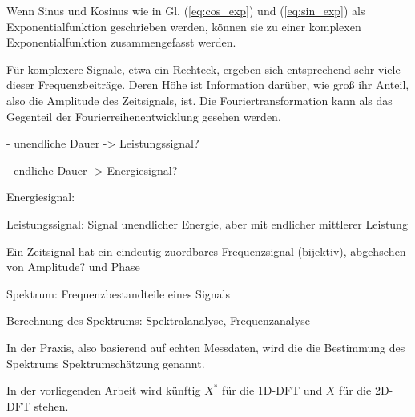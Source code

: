 Wenn Sinus und Kosinus wie in Gl. (\ref{eq:cos_exp}) und (\ref{eq:sin_exp}) als Exponentialfunktion geschrieben werden,
können sie zu einer komplexen Exponentialfunktion zusammengefasst werden.






Für komplexere Signale, etwa ein Rechteck, ergeben sich entsprechend sehr viele dieser Frequenzbeiträge. Deren Höhe ist Information darüber, wie groß ihr Anteil, also die Amplitude des 
Zeitsignals, ist. Die Fouriertransformation kann als das Gegenteil der Fourierreihenentwicklung gesehen werden.


- unendliche Dauer -> Leistungssignal?

- endliche Dauer -> Energiesignal?



Energiesignal:

Leistungssignal: Signal unendlicher Energie, aber mit endlicher mittlerer Leistung

Ein Zeitsignal hat ein eindeutig zuordbares Frequenzsignal (bijektiv), abgehsehen von Amplitude? und Phase

Spektrum: Frequenzbestandteile eines Signals

Berechnung des Spektrums: Spektralanalyse, Frequenzanalyse


In der Praxis, also basierend auf echten Messdaten, wird die die Bestimmung des Spektrums Spektrumschätzung genannt.


In der vorliegenden Arbeit wird künftig $X^*$ für die 1D-DFT und $X$ für die 2D-DFT stehen.

